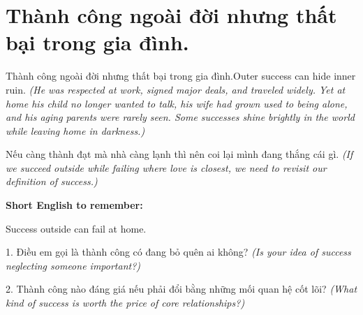 \section{Thành công ngoài đời nhưng thất bại trong gia đình.}
\begin{truyen}{Thành công ngoài đời nhưng thất bại trong gia đình.}{Outer success can hide inner ruin.}
\textit{(He was respected at work, signed major deals, and traveled widely. Yet at home his child no longer wanted to talk, his wife had grown used to being alone, and his aging parents were rarely seen. Some successes shine brightly in the world while leaving home in darkness.)}
\end{truyen}
\begin{baihoc}
Nếu càng thành đạt mà nhà càng lạnh thì nên coi lại mình đang thắng cái gì.
\textit{(If we succeed outside while failing where love is closest, we need to revisit our definition of success.)}
\end{baihoc}
\begin{ghinhoanh}
\textbf{Short English to remember:}

Success outside can fail at home.
\end{ghinhoanh}
\begin{tuhocnhanh}
1. Điều em gọi là thành công có đang bỏ quên ai không? \textit{(Is your idea of success neglecting someone important?)}

2. Thành công nào đáng giá nếu phải đổi bằng những mối quan hệ cốt lõi? \textit{(What kind of success is worth the price of core relationships?)}
\end{tuhocnhanh}
\ngancach

